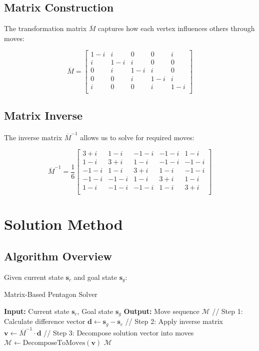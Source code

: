 \documentclass{article}
\begin{document}
\subsection{Matrix Construction}

The transformation matrix $\overline{M}$ captures how each vertex influences others through moves:

\[
\overline{M} = \begin{bmatrix}
    1 - i & i & 0 & 0 & i \\
    i & 1 - i & i & 0 & 0 \\
    0 & i & 1 - i & i & 0 \\
    0 & 0 & i & 1 - i & i \\
    i & 0 & 0 & i & 1 - i \\
\end{bmatrix}
\]

\subsection{Matrix Inverse}

The inverse matrix $\overline{M}^{-1}$ allows us to solve for required moves:

\[
\overline{M}^{-1} = \frac{1}{6}\begin{bmatrix}
    3+i & 1-i & -1-i & -1-i & 1-i \\
    1-i & 3+i & 1-i & -1-i & -1-i \\
    -1-i & 1-i & 3+i & 1-i & -1-i \\
    -1-i & -1-i & 1-i & 3+i & 1-i \\
    1-i & -1-i & -1-i & 1-i & 3+i \\
\end{bmatrix}
\]

\section{Solution Method}

\subsection{Algorithm Overview}

Given current state $\mathbf{s}_c$ and goal state $\mathbf{s}_g$:

\begin{algorithm}
\caption{Matrix-Based Pentagon Solver}
\begin{algorithmic}
\STATE \textbf{Input:} Current state $\mathbf{s}_c$, Goal state $\mathbf{s}_g$
\STATE \textbf{Output:} Move sequence $\mathcal{M}$
\STATE
\STATE // Step 1: Calculate difference vector
\STATE $\mathbf{d} \leftarrow \mathbf{s}_g - \mathbf{s}_c$
\STATE
\STATE // Step 2: Apply inverse matrix
\STATE $\mathbf{v} \leftarrow \overline{M}^{-1} \cdot \mathbf{d}$
\STATE
\STATE // Step 3: Decompose solution vector into moves
\STATE $\mathcal{M} \leftarrow \text{DecomposeToMoves}(\mathbf{v})$
\STATE
\RETURN $\mathcal{M}$
\end{algorithmic}
\end{algorithm}
\end{document}
